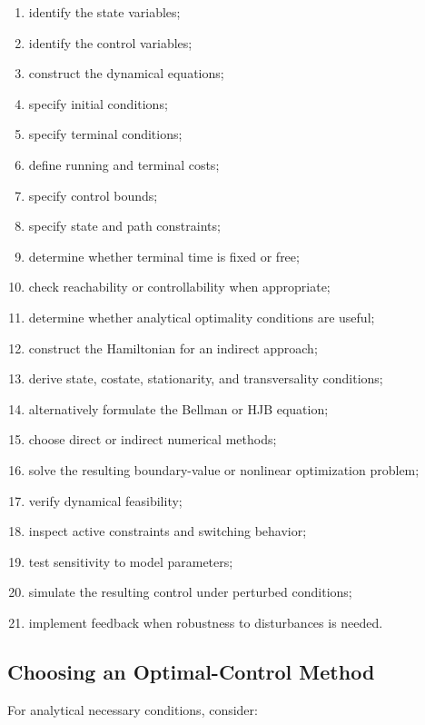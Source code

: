 \begin{enumerate}
    \item identify the state variables;
    \item identify the control variables;
    \item construct the dynamical equations;
    \item specify initial conditions;
    \item specify terminal conditions;
    \item define running and terminal costs;
    \item specify control bounds;
    \item specify state and path constraints;
    \item determine whether terminal time is fixed or free;
    \item check reachability or controllability when appropriate;
    \item determine whether analytical optimality conditions are useful;
    \item construct the Hamiltonian for an indirect approach;
    \item derive state, costate, stationarity, and transversality
          conditions;
    \item alternatively formulate the Bellman or HJB equation;
    \item choose direct or indirect numerical methods;
    \item solve the resulting boundary-value or nonlinear optimization
          problem;
    \item verify dynamical feasibility;
    \item inspect active constraints and switching behavior;
    \item test sensitivity to model parameters;
    \item simulate the resulting control under perturbed conditions;
    \item implement feedback when robustness to disturbances is needed.
\end{enumerate}

\subsection{Choosing an Optimal-Control Method}
\label{subsec:choosing-optimal-control-method}

For analytical necessary conditions, consider:

